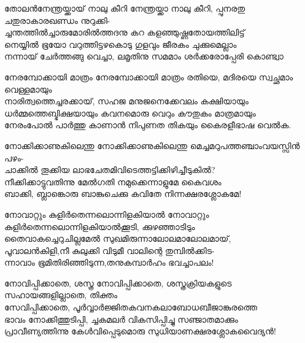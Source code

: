 \begin{enumerate}


\begin{slokam}{\VSr}{തോലൻ}{നേന്ത്രയ്ക്കായ് നാലു കീറി}
നേന്ത്രയ്ക്കാ നാലു കീറി, പ്പുനരതു ചതുരാകാരഖണ്ഡം നുറുക്കി-\\
ച്ചന്തത്തിൽച്ചാരുമോരിൽത്തദനു കറ കളഞ്ഞുഷ്ണതോയത്തിലിട്ട്\\
നെയ്യിൽ ഭൂയോ വറുത്തിട്ടഴകൊടു ഗുളവും ജീരകം ചുക്കുമെല്ലാം\\
നന്നായ് ചേർത്തങ്ങു വെച്ചാ, ലമൃതിനു സമമാം ശർക്കരോപ്പേരി കൊണ്ട്വാ
\end{slokam}


\begin{slokam}{\VSr}{\RV}{നേരമ്പോക്കായി മാത്രം}
നേരമ്പോക്കായി മാത്രം രതിയെ, മദിരയെ സ്വച്ഛമാം വെള്ളമായും\\
നാരിത്വത്തെച്ചരക്കായ്‌, സഹജ മനുജനെക്കേവലം കക്ഷിയായും\\
ധർമ്മത്തെബ്ഭിക്ഷയായും കവനമൊരു വെറും കൗതുകം മാത്രമായും\\
നേരംപോൽ പാർത്തു കാണാൻ നിപുണത തികയും കൈരളീഭാഷ വെൽക.
\end{slokam}


\begin{slokam}{\VSv}{\NDK}{നോക്കിക്കാണുകിലെന്തു}
നോക്കിക്കാണുകിലെന്തു മെച്ചമറുപത്തഞ്ചാംവയസ്സിൻ പഴം-\\
ചാക്കിൽ തൂക്കിയ ലാഭചേതമിവിടെത്തട്ടിക്കിഴിച്ചീടുകിൽ?\\
നീക്കിക്കാട്ടുവതിന്നു മേൽഗതി നമുക്കെന്നാളുമേ കൈവശം\\
ബാക്കി, ബ്ലാങ്കൊരു ബാങ്കുചെക്കു കവിതേ നിന്നക്ഷരശ്ലോകമേ!
\end{slokam}


\begin{slokam}{\VSv}{\KND}{നോവാറ്റും കുളിർതെന്നലൊന്നിളകിയാൽ}
നോവാറ്റും കുളിർതെന്നലൊന്നിളകിയാൽക്കൂടി, ക്കുഴഞ്ഞാടിടും\\
തൈവാകച്ചെറുചില്ലമേൽ സുഖമിരുന്നാലോലമാലോലമായ്,\\
പൂവാലൻകിളി,നീ കുലുക്കി വിടുമീ വാലിന്റെ തുമ്പിൽക്കിട-\\
ന്നാവാം ഭൂമിതിരിഞ്ഞിടുന്ന,തനുകമ്പാർഹം ഭവച്ചാപലം!
\end{slokam}



\begin{slokam}{\VSr}{\VKG}{നോവിപ്പിക്കാതെ, ശസ്ത്ര}
നോവിപ്പിക്കാതെ, ശസ്ത്രക്രിയകളുടെ സഹായങ്ങളില്ലാതെ, തിക്തം\\
സേവിപ്പിക്കാതെ, പൂർവ്വാർജ്ജിതകവനകലാബോധബീജാങ്കുരത്തെ\\
ഭാവം നോക്കിത്തുടിപ്പി, ച്ചകമലർ വികസിപ്പിച്ചു സഞ്ജാതമാക്കും\\
പ്രാവീണ്യത്തിന്നു കേള്‍വിപ്പെടുമൊരു സുധിയാണക്ഷരശ്ലോകവൈദ്യൻ!
\end{slokam}



\end{enumerate}
